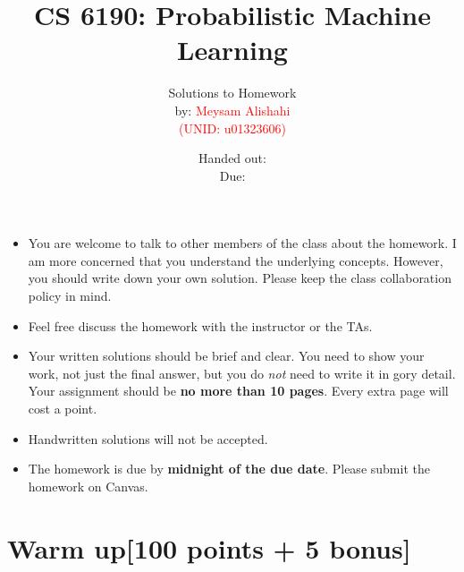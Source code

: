 \documentclass[12pt, fullpage,letterpaper]{article}
\title{CS 6190: Probabilistic Machine Learning \semester}
\author{Solutions to Homework \assignmentId\\
by: \textcolor{red}{Meysam Alishahi} \\ 
\textcolor{red}{(UNID: u01323606)}
}
\date{Handed out: \releaseDate\\
  Due: \dueDate}
\begin{document}
\maketitle


\footnotesize
	\begin{itemize}
		\item You are welcome to talk to other members of the class about
		the homework. I am more concerned that you understand the
		underlying concepts. However, you should write down your own
		solution. Please keep the class collaboration policy in mind.
		
		\item Feel free discuss the homework with the instructor or the TAs.
		
		\item Your written solutions should be brief and clear. You need to
		show your work, not just the final answer, but you do \emph{not}
		need to write it in gory detail. Your assignment should be {\bf no
			more than 10 pages}. Every extra page will cost a point.
		
		\item Handwritten solutions will not be accepted.
		
		\item The homework is due by \textbf{midnight of the due date}. Please submit
		the homework on Canvas.
	\end{itemize}



\section*{Warm up[100 points + 5 bonus]}	
\label{sec:q1}
\end{document}
